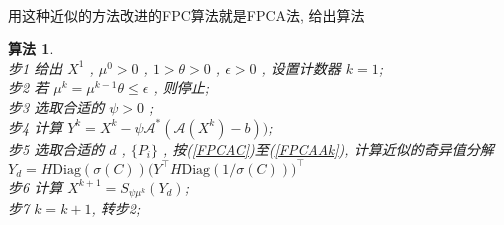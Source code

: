 \documentclass[a4paper, UTF8]{ctexart}
\newtheorem{algo}{\bf 算法}
\numberwithin{equation}{section}  %
\begin{document}
			\paragraph{}
				\quad 用这种近似的方法改进的FPC算法就是FPCA法, 给出算法
				\begin{algo}
					\quad\\
					步1 \quad 给出 $X^1$ , $\mu^0 > 0$ , $1 > \theta > 0$ , $\epsilon > 0$ , 设置计数器 $k = 1$;\\
					步2 \quad 若 $\mu^k = \mu^{k -1} \theta \le \epsilon$ , 则停止;\\
					步3 \quad 选取合适的 $\psi > 0$ ;\\
					步4 \quad 计算 $Y^k = X^k - \psi \mathcal{A}^*(\mathcal{A}(X^k) - b))$;\\
					步5 \quad 选取合适的 $d$ , $\{P_i\}$ , 按(\ref{FPCAC})至(\ref{FPCAAk}), 计算近似的奇异值分解 $Y_d = H \text{Diag}(\sigma(C)) \big(Y ^\top H \text{Diag}(1/\sigma(C))\big)^\top$\\
					步6 \quad 计算 $X^{k + 1} = S_{\psi \mu^k}(Y_d)$;\\
					步7 \quad $k = k + 1$, 转步2;
				\end{algo}
\end{document}
